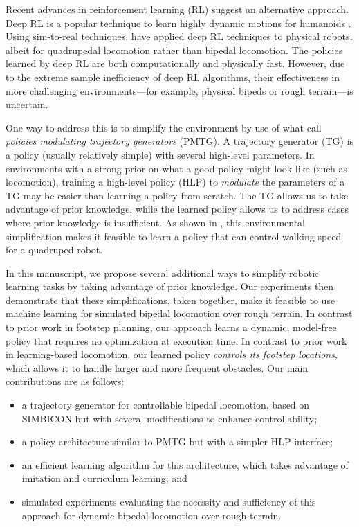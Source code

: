 \documentclass[conference]{IEEEtran}
\begin{document}
Recent advances in reinforcement learning (RL) suggest an alternative approach.
Deep RL is a popular technique to learn highly dynamic motions for humanoids \citep{peng2018deepmimic, heess2017emergence}.
Using sim-to-real techniques, \citet{tan2018sim} have applied deep RL techniques to physical robots, albeit for quadrupedal locomotion rather than bipedal locomotion.
The policies learned by deep RL are both computationally and physically fast.
However, due to the extreme sample inefficiency of deep RL algorithms, their effectiveness in more challenging environments---for example, physical bipeds or rough terrain---is uncertain.

One way to address this is to simplify the environment by use of what \citet{iscen2018pmtg} call \emph{policies modulating trajectory generators} (PMTG).
A trajectory generator (TG) is a policy (usually relatively simple) with several high-level parameters.
In environments with a strong prior on what a good policy might look like (such as locomotion),
training a high-level policy (HLP) to \emph{modulate} the parameters of a TG may be easier than learning a policy from scratch.
The TG allows us to take advantage of prior knowledge, while the learned policy allows us to address cases where prior knowledge is insufficient.
As shown in \citet{iscen2018pmtg}, this environmental simplification makes it feasible to learn a policy that can control walking speed for a quadruped robot.

In this manuscript, we propose several additional ways to simplify robotic learning tasks by taking advantage of prior knowledge.
Our experiments then demonstrate that these simplifications, taken together, make it feasible to use machine learning for simulated bipedal locomotion over rough terrain.
In contrast to prior work in footstep planning, our approach learns a dynamic, model-free policy that requires no optimization at execution time.
In contrast to prior work in learning-based locomotion, our learned policy \emph{controls its footstep locations}, which allows it to handle larger and more frequent obstacles.
Our main contributions are as follows:
\begin{itemize}
  \item a trajectory generator for controllable bipedal locomotion, based on SIMBICON \citep{yin2007simbicon} but with several modifications to enhance controllability;
  \item a policy architecture similar to PMTG but with a simpler HLP interface;
  \item an efficient learning algorithm for this architecture, which takes advantage of imitation and curriculum learning; and
  \item simulated experiments evaluating the necessity and sufficiency of this approach for dynamic bipedal locomotion over rough terrain.
\end{itemize}
\end{document}
